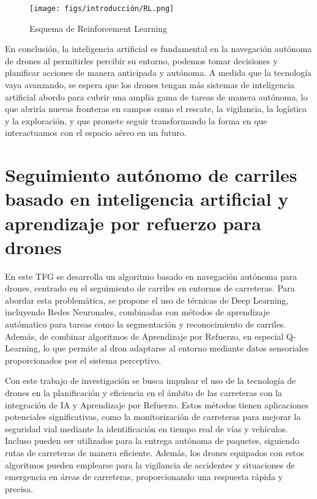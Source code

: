 \begin{figure} [H]
  \begin{center}
    \texttt{[image: figs/introducción/RL.png]}
  \end{center}
  \caption{Esquema de Reinforcement Learning \cite{BecomingHuman_RL_Basics}}
  \label{fig:Reinforcement Learning}
  \vspace{-1.5em}
\end{figure}

En conclusión, la inteligencia artificial es fundamental en la navegación autónoma de drones al permitirles percibir su entorno, podemos tomar decisiones y planificar acciones 
de manera anticipada y autónoma. A medida que la tecnología vaya avanzando, se espera que los drones tengan más sistemas de inteligencia artificial abordo para cubrir una amplia gama de tareas
de manera autónoma, lo que abriría nuevas fronteras en campos como el rescate, la vigilancia, la logística y la exploración, y que promete seguir transformando la forma en que 
interactuamos con el espacio aéreo en un futuro. 

\section{Seguimiento autónomo de carriles basado en inteligencia artificial y aprendizaje por refuerzo para drones}
\label{sec:Navegación autónoma}

En este TFG se desarrolla un algoritmo basado en navegación autónoma para drones, centrado en el seguimiento de carriles en entornos de carreteras. Para abordar esta problemática, se propone 
el uso de técnicas de Deep Learning, incluyendo Redes Neuronales, combinadas con métodos de aprendizaje autómatico para tareas como la segmentación y reconocimiento de carriles. Además, 
de combinar algoritmos de Aprendizaje por Refuerzo, en especial Q-Learning, lo que permite al dron adaptarse al entorno mediante datos sensoriales proporcionados por el sistema perceptivo.

Con este trabajo de investigación se busca impulsar el uso de la tecnología de drones en la planificación y eficiencia en el ámbito de las carreteras con la integración 
de IA y Aprendizaje por Refuerzo. Estos métodos tienen aplicaciones potenciales significativas, como la monitorización de carreteras para mejorar la seguridad vial mediante la identificación en tiempo 
real de vías y vehículos. Incluso pueden ser utilizados para la entrega autónoma de paquetes, siguiendo rutas de carreteras de manera eficiente. Además, los drones equipados 
con estos algoritmos pueden emplearse para la vigilancia de accidentes y situaciones de emergencia en áreas de carreteras, proporcionando una respuesta rápida y precisa.




